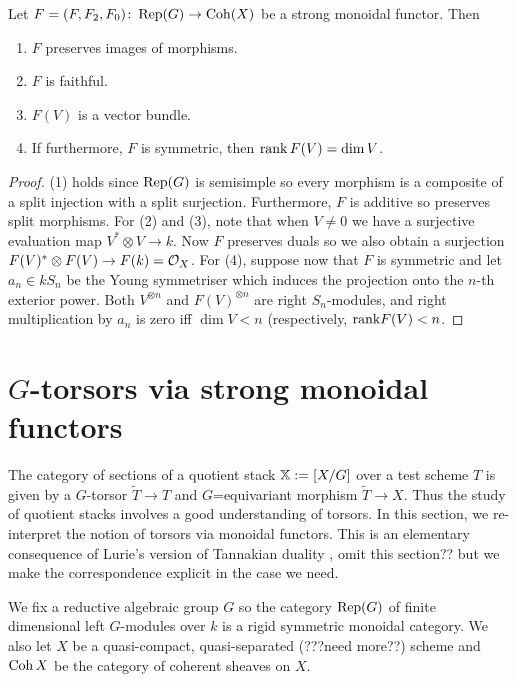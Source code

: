\documentclass[12pt]{amsart}
\begin{document}
\begin{proposition} \label{prop:isbundle}
Let $F = (F,F_2,F_0) \colon \operatorname{Rep}(G) \to \operatorname{Coh}(X)$ be a strong monoidal functor. Then 
\begin{enumerate}
    \item $F$ preserves images of morphisms.
    \item $F$ is faithful.
    \item $F(V)$ is a vector bundle.
    \item If furthermore, $F$ is symmetric, then $\operatorname{rank} F(V) = \dim V$. 
\end{enumerate}
\end{proposition}
\begin{proof} (1) holds since $\operatorname{Rep}(G)$ is semisimple so every morphism is a composite of a split injection with a split surjection. Furthermore, $F$ is additive so preserves split morphisms. For (2) and (3), note that when $V \neq 0$ we have a surjective evaluation map $V^* \otimes V \to k$. Now $F$ preserves duals so we also obtain a surjection $F(V)^* \otimes F(V) \to F(k) = \mathcal{O}_X$. For (4), suppose now that $F$ is symmetric and let $a_n \in kS_n$ be the Young symmetriser which induces the projection onto the $n$-th exterior power. Both $V^{\otimes n}$ and $F(V)^{\otimes n}$ are right $S_n$-modules, and right multiplication by $a_n$ is zero iff $\dim V < n$ (respectively, $\textup{rank} F(V) < n$.
\end{proof}

\section{$G$-torsors via strong monoidal functors}

The category of sections of a quotient stack $\mathbb{X} : = [X/G]$ over a test scheme $T$ is given by a $G$-torsor $\tilde{T} \to T$ and $G$=equivariant morphism $\tilde{T} \to X$. Thus the study of quotient stacks involves a good understanding of torsors. In this section, we re-interpret the notion of torsors via monoidal functors. This is an elementary consequence of Lurie's version of Tannakian duality \cite{Lurie}, {\red omit this section??} but we make the correspondence explicit in the case we need. 

We fix a reductive algebraic group $G$ so the category $\operatorname{Rep}(G)$ of finite dimensional left $G$-modules over $k$ is a rigid symmetric monoidal category. We also let $X$ be a quasi-compact, quasi-separated (???need more??) scheme and $\operatorname{Coh} X$ be the category of coherent sheaves on $X$.
\end{document}
